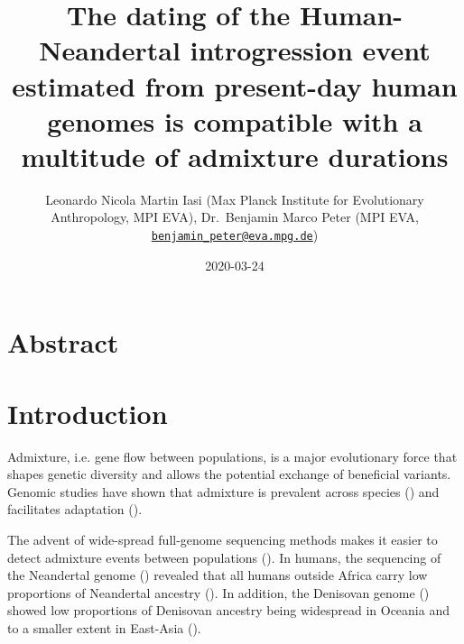 \documentclass[]{article}
\title{The dating of the Human-Neandertal introgression event estimated from present-day human genomes is compatible with a multitude of admixture durations}
\author{Leonardo Nicola Martin Iasi (Max Planck Institute for Evolutionary
Anthropology, MPI EVA), Dr.~Benjamin Marco Peter (MPI EVA,
\href{mailto:benjamin_peter@eva.mpg.de}{\nolinkurl{benjamin\_peter@eva.mpg.de}})}
\date{2020-03-24}
\begin{document}
\maketitle

\section{Abstract}\label{abstract}

\section{Introduction}\label{introduction}

Admixture, i.e. gene flow between populations, is a major evolutionary force that shapes genetic diversity and allows the potential exchange of beneficial variants. Genomic studies have shown that admixture is prevalent across species (\cite{Salazar_Hybrid_speciation_2010, rieseberg_hybridization_2007,kronforst_multilocus_2006,kolbe_multiple_2007}) and facilitates adaptation (\cite{harrison_hybridization_2014,hedrick_adaptive_2013, shaw_genes_2011,payseur_using_2010}).

The advent of wide-spread full-genome sequencing methods makes it easier to detect admixture events
between populations (\cite{sousa_understanding_2013}). In humans, the sequencing of
the Neandertal genome (\cite{green_draft_2010}) revealed that all humans outside Africa carry low proportions of Neandertal ancestry
(\cite{green_draft_2010,prufer_complete_2013,vernot_resurrecting_2014,fu_early_2015,fu_genome_2014,sankararaman_genomic_2014,prufer_high-coverage_2017}). In addition, the  Denisovan genome (\cite{reich_genetic_2010})
showed low proportions of Denisovan ancestry being widespread in Oceania and to a smaller extent in East-Asia
(\cite{reich_genetic_2010,meyer_high-coverage_2012,sankararaman_combined_2016,vernot_excavating_2016,malaspinas_genomic_2016}).
\end{document}
